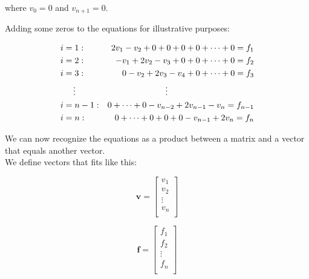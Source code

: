where $v_0 = 0$ and $v_{n+1} = 0$.

Adding some zeros to the equations for illustrative purposes:

\begin{align*}
&i = 1:  &2v_1-v_2 + 0 + 0 + 0 +0 + \cdots + 0 = f_1  \\
&i = 2: &-v_1+2v_2-v_3 +0 + 0 + \cdots + 0 = f_2 \\
&i = 3:  &0 -v_2+2v_3-v_4 + 0 + \cdots + 0 = f_3 \\
&\indent\vdots \indent &\vdots \indent \indent \hspace{2cm} \indent \\
&i = n-1: &0 + \cdots+ 0 -v_{n-2}+2v_{n-1} - v_n= f_{n-1}\\
&i = n: &0 + \cdots + 0 + 0 + 0 -v_{n-1}+2v_n= f_n \\
\end{align*}

We can now recognize the equations as a product between a matrix and a vector that equals another vector.\\

We define vectors that fits like this:
\begin{multicols}{3}
$$\textbf{v} = \begin{bmatrix}
	v_1\\
	v_2\\
	\vdots\\
	v_{n}\\
\end{bmatrix}$$

$$ \textbf{f} = \begin{bmatrix}
	f_1\\
	f_2\\
	\vdots\\
	f_{n}\\
\end{bmatrix} $$
\end{multicols}

